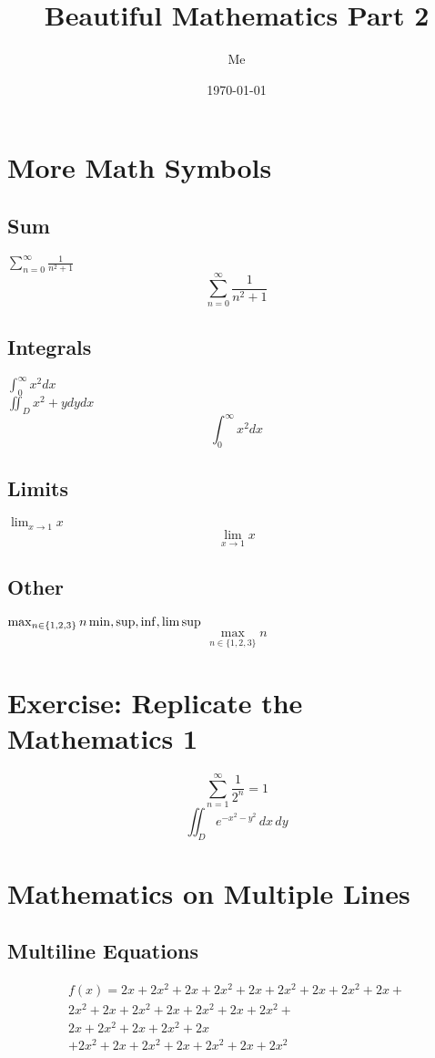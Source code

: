 \documentclass[12pt,titlepage]{article}
\title{Beautiful Mathematics Part 2}
\author{Me}
\date{\today}
\begin{document}
\maketitle
\newpage
\tableofcontents
\newpage

\section{More Math Symbols}
\subsection{Sum}
$\sum_{n=0}^{\infty}\frac{1}{n^{2}+1}$
\[\sum_{n=0}^{\infty}\frac{1}{n^{2}+1}\]

\subsection{Integrals}
$\int_{0}^{\infty}x^{2}dx$\\
$\iint_{D}^{}x^{2}+ydydx$
\[\int_{0}^{\infty}x^{2}dx\]

\subsection{Limits}
$\lim_{x \to 1}x$
\[\lim_{x \to 1}x\]

\subsection{Other}
$\max_{n \in \{1, 2, 3\}}n \\ \min, \sup, \inf, \limsup$
\[\max_{n \in \{1, 2, 3\}}n\]

\section{Exercise: Replicate the Mathematics 1}
\[\sum_{n=1}^{\infty}\frac{1}{2^{n}}=1\]
\[\iint_{D}e^{-x^{2}-y^{2}}\,dx\,dy\]

\newpage
\section{Mathematics on Multiple Lines}
\subsection{Multiline Equations}
\begin{multline} \label{multiline_env}
    f(x) = 2x+2x^2+2x+2x^2+2x+2x^2+2x+2x^2+2x+\\2x^2+2x+2x^2+2x+2x^2+2x+2x^2+\\2x+2x^2+2x+2x^2+2x\\+2x^2+2x+2x^2+2x+2x^2+2x+2x^2
\end{multline}
\end{document}
